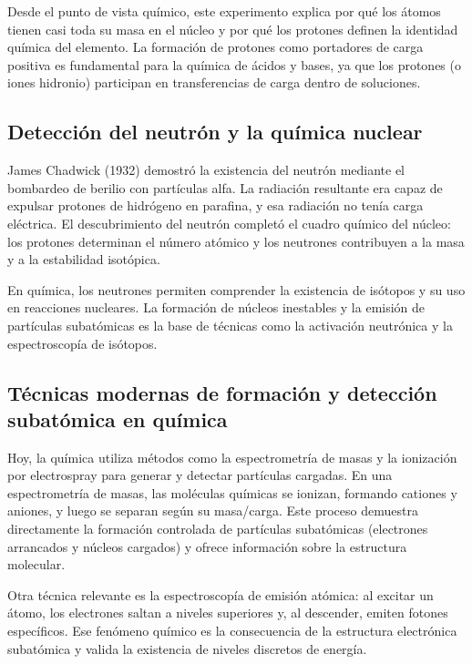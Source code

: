 \documentclass{article}
\begin{document}
    Desde el punto de vista químico, este experimento explica por qué los átomos tienen casi toda su masa en el núcleo y por qué los protones definen la identidad química del elemento. La formación de protones como portadores de carga positiva es fundamental para la química de ácidos y bases, ya que los protones (o iones hidronio) participan en transferencias de carga dentro de soluciones.

    \subsection{Detección del neutrón y la química nuclear}

    James Chadwick (1932) demostró la existencia del neutrón mediante el bombardeo de berilio con partículas alfa. La radiación resultante era capaz de expulsar protones de hidrógeno en parafina, y esa radiación no tenía carga eléctrica. El descubrimiento del neutrón completó el cuadro químico del núcleo: los protones determinan el número atómico y los neutrones contribuyen a la masa y a la estabilidad isotópica.

    En química, los neutrones permiten comprender la existencia de isótopos y su uso en reacciones nucleares. La formación de núcleos inestables y la emisión de partículas subatómicas es la base de técnicas como la activación neutrónica y la espectroscopía de isótopos.

    \subsection{Técnicas modernas de formación y detección subatómica en química}

    Hoy, la química utiliza métodos como la espectrometría de masas y la ionización por electrospray para generar y detectar partículas cargadas. En una espectrometría de masas, las moléculas químicas se ionizan, formando cationes y aniones, y luego se separan según su masa/carga. Este proceso demuestra directamente la formación controlada de partículas subatómicas (electrones arrancados y núcleos cargados) y ofrece información sobre la estructura molecular.

    Otra técnica relevante es la espectroscopía de emisión atómica: al excitar un átomo, los electrones saltan a niveles superiores y, al descender, emiten fotones específicos. Ese fenómeno químico es la consecuencia de la estructura electrónica subatómica y valida la existencia de niveles discretos de energía.
\end{document}

